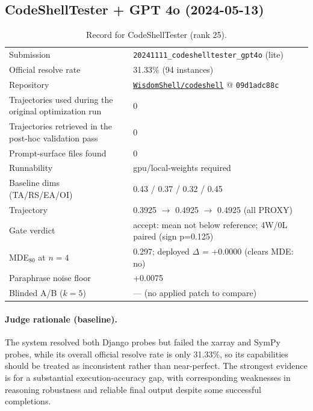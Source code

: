 \subsection{CodeShellTester + GPT 4o (2024-05-13)}
\label{app:agent25}
\begin{table}[H]\centering\scriptsize
\caption{Record for CodeShellTester (rank 25).}
\begin{tabular}{lp{8.2cm}}\toprule
Submission & \texttt{20241111\_\allowbreak{}codeshelltester\_\allowbreak{}gpt4o} (lite) \\
Official resolve rate & 31.33\% (94 instances) \\
Repository & \href{https://github.com/WisdomShell/codeshell}{\texttt{WisdomShell/codeshell}} @ \texttt{09d1adc88c} \\
Trajectories used during the original optimization run & 0 \\
Trajectories retrieved in the post-hoc validation pass & 0 \\
Prompt-surface files found & 0 \\
Runnability & gpu/local-weights required \\
Baseline dims (TA/RS/EA/OI) & 0.43 / 0.37 / 0.32 / 0.45 \\
Trajectory & 0.3925 $\to$ 0.4925 $\to$ 0.4925 (all PROXY) \\
Gate verdict & accept: mean not below reference; 4W/0L paired (sign p=0.125) \\
MDE$_{80}$ at $n{=}4$ & 0.297; deployed $\Delta$ = +0.0000 (clears MDE: no) \\
Paraphrase noise floor & +0.0075 \\
Blinded A/B ($k{=}5$) & --- (no applied patch to compare) \\
\bottomrule\end{tabular}\end{table}
\paragraph{Judge rationale (baseline).}
The system resolved both Django probes but failed the xarray and SymPy probes, while its overall official resolve rate is only 31.33\%, so its capabilities should be treated as inconsistent rather than near-perfect. The strongest evidence is for a substantial execution-accuracy gap, with corresponding weaknesses in reasoning robustness and reliable final output despite some successful completions.
